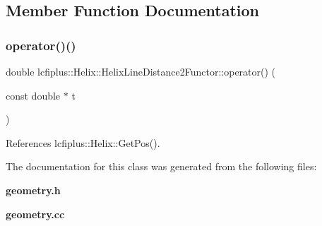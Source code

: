 \subsection{Member Function Documentation}
\mbox{\label{classlcfiplus_1_1Helix_1_1HelixLineDistance2Functor_ab44661793ccf39a422226219f371913a}} 
\subsubsection{operator()()}
{\footnotesize\ttfamily double lcfiplus\+::\+Helix\+::\+Helix\+Line\+Distance2\+Functor\+::operator() (\begin{DoxyParamCaption}\item[{const double $\ast$}]{t }\end{DoxyParamCaption})}



References lcfiplus\+::\+Helix\+::\+Get\+Pos().



The documentation for this class was generated from the following files\+:\begin{DoxyCompactItemize}
\item 
\textbf{ geometry.\+h}\item 
\textbf{ geometry.\+cc}\end{DoxyCompactItemize}
